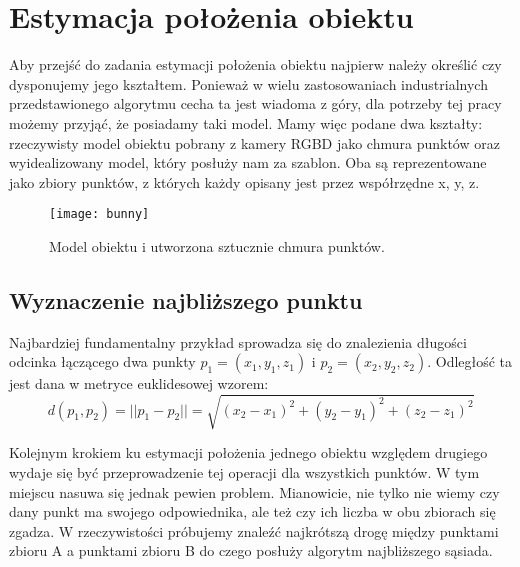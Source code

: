 \documentclass[12pt]{article}
\begin{document}
\newpage
\section{Estymacja położenia obiektu}
Aby przejść do zadania estymacji położenia obiektu najpierw należy określić czy dysponujemy jego kształtem. Ponieważ w wielu zastosowaniach industrialnych przedstawionego algorytmu cecha ta jest wiadoma z góry, dla potrzeby tej pracy możemy przyjąć, że posiadamy taki model. Mamy więc podane dwa kształty: rzeczywisty model obiektu pobrany z kamery RGBD jako chmura punktów oraz wyidealizowany model, który posłuży nam za szablon. Oba są reprezentowane jako zbiory punktów, z których każdy opisany jest przez współrzędne x, y, z.

\begin{figure}[h]
\centering
\texttt{[image: bunny]}
\caption{Model obiektu i utworzona sztucznie chmura punktów.}
\end{figure}

\subsection{Wyznaczenie najbliższego punktu}

Najbardziej fundamentalny przykład sprowadza się do znalezienia długości odcinka łączącego dwa punkty $p_{1} = (x_{1}, y_{1}, z_{1})$ i $p_{2} = (x_{2}, y_{2}, z_{2})$. Odległość ta jest dana w metryce euklidesowej wzorem: 
\[d(p_{1}, p_{2}) = ||p_{1} - p_{2}|| = \sqrt{(x_{2}-x_{1})^2+(y_{2}-y_{1})^2+(z_{2}-z_{1})^2}\]

Kolejnym krokiem ku estymacji położenia jednego obiektu względem drugiego wydaje się być przeprowadzenie tej operacji dla wszystkich punktów. W tym miejscu nasuwa się jednak pewien problem. Mianowicie, nie tylko nie wiemy czy dany punkt ma swojego odpowiednika, ale też czy ich liczba w obu zbiorach się zgadza. W rzeczywistości próbujemy znaleźć najkrótszą drogę między punktami zbioru A a punktami zbioru B do czego posłuży algorytm najbliższego sąsiada.
\end{document}
